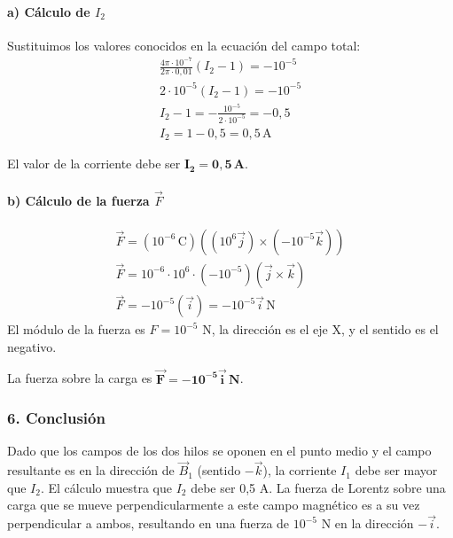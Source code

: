 \paragraph{a) Cálculo de $I_2$}
Sustituimos los valores conocidos en la ecuación del campo total:
\begin{gather}
    \frac{4\pi \cdot 10^{-7}}{2\pi \cdot 0,01}(I_2 - 1) = -10^{-5} \nonumber \\
    2 \cdot 10^{-5} (I_2 - 1) = -10^{-5} \nonumber \\
    I_2 - 1 = -\frac{10^{-5}}{2 \cdot 10^{-5}} = -0,5 \nonumber \\
    I_2 = 1 - 0,5 = 0,5 \, \text{A}
\end{gather}
\begin{cajaresultado}
    El valor de la corriente debe ser $\boldsymbol{I_2 = 0,5 \, \textbf{A}}$.
\end{cajaresultado}

\paragraph{b) Cálculo de la fuerza $\vec{F}$}
\begin{gather}
    \vec{F} = (10^{-6} \, \text{C}) \left( (10^6 \vec{j}) \times (-10^{-5} \vec{k}) \right) \nonumber \\
    \vec{F} = 10^{-6} \cdot 10^6 \cdot (-10^{-5}) (\vec{j} \times \vec{k}) \nonumber \\
    \vec{F} = -10^{-5} (\vec{i}) = -10^{-5} \vec{i} \, \text{N}
\end{gather}
El módulo de la fuerza es $F = 10^{-5}$ N, la dirección es el eje X, y el sentido es el negativo.
\begin{cajaresultado}
    La fuerza sobre la carga es $\boldsymbol{\vec{F} = -10^{-5} \vec{i} \, \textbf{N}}$.
\end{cajaresultado}

\subsubsection*{6. Conclusión}
\begin{cajaconclusion}
Dado que los campos de los dos hilos se oponen en el punto medio y el campo resultante es en la dirección de $\vec{B}_1$ (sentido $-\vec{k}$), la corriente $I_1$ debe ser mayor que $I_2$. El cálculo muestra que $I_2$ debe ser 0,5 A. La fuerza de Lorentz sobre una carga que se mueve perpendicularmente a este campo magnético es a su vez perpendicular a ambos, resultando en una fuerza de $10^{-5}$ N en la dirección $-\vec{i}$.
\end{cajaconclusion}

